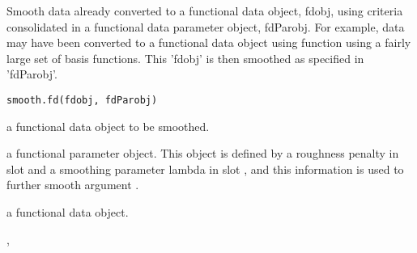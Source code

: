 \documentclass{article}
\begin{document}
\begin{Description}\relax
Smooth data already converted to a functional data object, fdobj,
using criteria consolidated in a functional data parameter object,
fdParobj.  For example, data may have been converted to a functional
data object using function  using a fairly large set of
basis functions.  This 'fdobj' is then smoothed as specified in
'fdParobj'.
\end{Description}
\begin{Usage}
\begin{verbatim}
smooth.fd(fdobj, fdParobj)
\end{verbatim}
\end{Usage}
\begin{Arguments}
\begin{ldescription}
\item[\code{fdobj}] a functional data object to be smoothed.

\item[\code{fdParobj}] a functional parameter object. This object is defined by a roughness
penalty in slot  and a smoothing parameter lambda in slot
, and this information is used to further smooth argument .

\end{ldescription}
\end{Arguments}
\begin{Value}
a functional data object.
\end{Value}
\begin{SeeAlso}\relax
{}, 
\end{SeeAlso}
\end{document}
